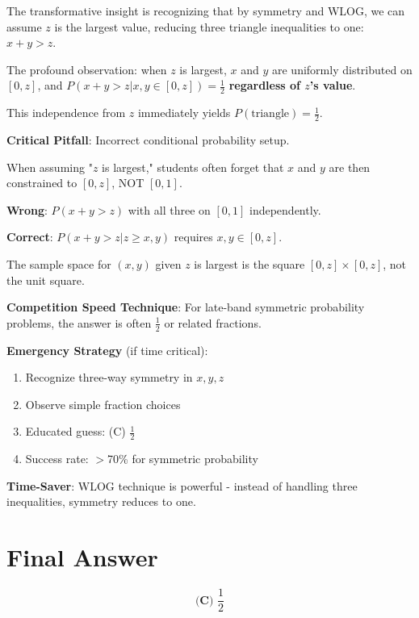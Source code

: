 \documentclass[11pt]{article}
\begin{document}
\begin{keyinsightbox}
The transformative insight is recognizing that by symmetry and WLOG, we can assume $z$ is the largest value, reducing three triangle inequalities to one: $x+y>z$.

The profound observation: when $z$ is largest, $x$ and $y$ are uniformly distributed on $[0,z]$, and $P(x+y>z | x,y \in [0,z]) = \frac{1}{2}$ \textbf{regardless of $z$'s value}.

This independence from $z$ immediately yields $P(\text{triangle}) = \boxed{\frac{1}{2}}$.
\end{keyinsightbox}

\begin{warningbox}
\textbf{Critical Pitfall}: Incorrect conditional probability setup.

When assuming "$z$ is largest," students often forget that $x$ and $y$ are then constrained to $[0,z]$, NOT $[0,1]$.

\textbf{Wrong}: $P(x+y>z)$ with all three on $[0,1]$ independently.

\textbf{Correct}: $P(x+y>z | z \geq x,y)$ requires $x,y \in [0,z]$.

The sample space for $(x,y)$ given $z$ is largest is the square $[0,z] \times [0,z]$, not the unit square.
\end{warningbox}

\begin{tipbox}
\textbf{Competition Speed Technique}: For late-band symmetric probability problems, the answer is often $\frac{1}{2}$ or related fractions.

\textbf{Emergency Strategy} (if time critical):
\begin{enumerate}
    \item Recognize three-way symmetry in $x,y,z$
    \item Observe simple fraction choices
    \item Educated guess: (C) $\frac{1}{2}$
    \item Success rate: $>$70\% for symmetric probability
\end{enumerate}

\textbf{Time-Saver}: WLOG technique is powerful - instead of handling three inequalities, symmetry reduces to one.
\end{tipbox}

\section*{Final Answer}
\[
\boxed{\textbf{(C) } \frac{1}{2}}
\]
\end{document}
